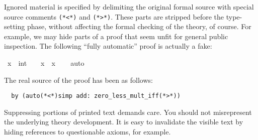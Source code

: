 \begin{isabellebody}
\begin{isamarkuptext}
  Ignored material is specified by delimiting the original formal
  source with special source comments
  \verb,(,\verb,*,\verb,<,\verb,*,\verb,), and
  \verb,(,\verb,*,\verb,>,\verb,*,\verb,),.  These parts are stripped
  before the type-setting phase, without affecting the formal checking
  of the theory, of course.  For example, we may hide parts of a proof
  that seem unfit for general public inspection.  The following
  ``fully automatic'' proof is actually a fake:%
\end{isamarkuptext}%
\isamarkuptrue%
\isamarkupfalse%
\ {}x\ {}\ {}{}{}{}int{}\ {}\ {}\ {}\ x\ {}\ x{}\isanewline
%
\isadelimproof
\ \ %
\endisadelimproof
%
\isatagproof
{}\isamarkupfalse%
\ {}auto{}%
\endisatagproof
{\isafoldproof}%
%
\isadelimproof
%
\endisadelimproof
%
\begin{isamarkuptext}%
\noindent The real source of the proof has been as follows:

\begin{verbatim}
  by (auto(*<*)simp add: zero_less_mult_iff(*>*))
\end{verbatim}

  \medskip Suppressing portions of printed text demands care.  You
  should not misrepresent the underlying theory development.  It is
  easy to invalidate the visible text by hiding references to
  questionable axioms, for example.%
\end{isamarkuptext}%
\isamarkuptrue%
%
\isadelimtheory
%
\endisadelimtheory
%
\isatagtheory
%
\endisatagtheory
{\isafoldtheory}%
%
\isadelimtheory
%
\endisadelimtheory
\end{isabellebody}%
